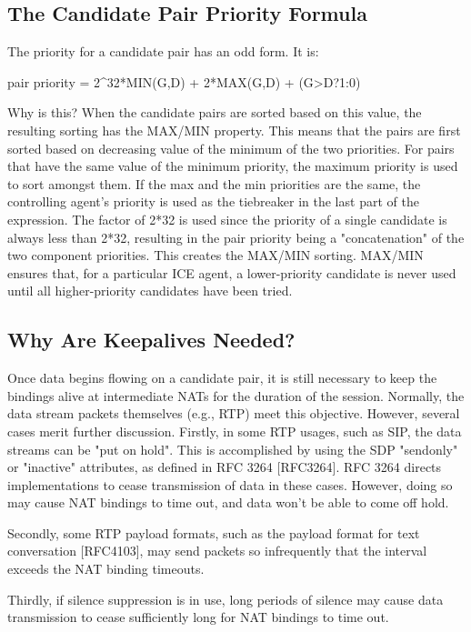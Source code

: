 \documentclass{article}
\begin{document}
\subsection{The Candidate Pair Priority Formula}

The priority for a candidate pair has an odd form.  It is:

pair priority = 2\textasciicircum{}32*MIN(G,D) + 2*MAX(G,D) + (G>D?1:0)

Why is this?  When the candidate pairs are sorted based on this value, the resulting sorting has the MAX/MIN property.  This means that the pairs are first sorted based on decreasing value of the minimum of the two priorities.  For pairs that have the same value of the minimum priority, the maximum priority is used to sort amongst them.  If the max and the min priorities are the same, the controlling agent's priority is used as the tiebreaker in the last part of the expression.  The factor of 2*32 is used since the priority of a single candidate is always less than 2*32, resulting in the pair priority being a "concatenation" of the two component priorities.  This creates the MAX/MIN sorting.  MAX/MIN ensures that, for a particular ICE agent, a lower-priority candidate is never used until all higher-priority candidates have been tried.

\subsection{Why Are Keepalives Needed?}

Once data begins flowing on a candidate pair, it is still necessary to keep the bindings alive at intermediate NATs for the duration of the session.  Normally, the data stream packets themselves (e.g., RTP) meet this objective.  However, several cases merit further discussion.  Firstly, in some RTP usages, such as SIP, the data streams can be "put on hold".  This is accomplished by using the SDP "sendonly" or "inactive" attributes, as defined in RFC 3264 [RFC3264].  RFC 3264 directs implementations to cease transmission of data in these cases.  However, doing so may cause NAT bindings to time out, and data won't be able to come off hold.

Secondly, some RTP payload formats, such as the payload format for text conversation [RFC4103], may send packets so infrequently that the interval exceeds the NAT binding timeouts.

Thirdly, if silence suppression is in use, long periods of silence may cause data transmission to cease sufficiently long for NAT bindings to time out.
\end{document}
